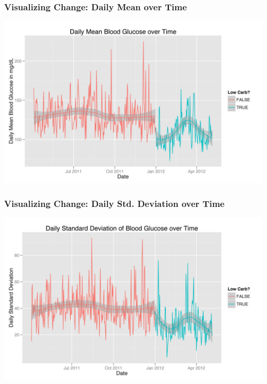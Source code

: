 \documentclass[handout]{beamer}
\begin{document}
\begin{frame}
  \frametitle{Visualizing Change: Daily Mean over Time}

  \begin{center}
    \includegraphics[width=\textwidth]{mean_blood_glucose.jpg}
  \end{center}

\end{frame}

\begin{frame}
  \frametitle{Visualizing Change: Daily Std. Deviation over Time}
  
  \begin{center}
    \includegraphics[width=\textwidth]{standard_deviation.jpg}
  \end{center}

\end{frame}
\end{document}
